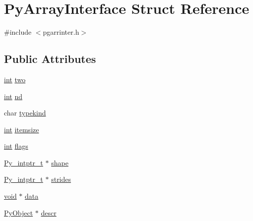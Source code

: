 \hypertarget{struct_py_array_interface}{}\section{Py\+Array\+Interface Struct Reference}
\label{struct_py_array_interface}


{\ttfamily \#include $<$pgarrinter.\+h$>$}

\subsection*{Public Attributes}
\begin{DoxyCompactItemize}
\item 
\mbox{\hyperlink{warnings_8h_a74f207b5aa4ba51c3a2ad59b219a423b}{int}} \mbox{\hyperlink{struct_py_array_interface_ab6d24fbafdbe601ef3c77720ffecb470}{two}}
\item 
\mbox{\hyperlink{warnings_8h_a74f207b5aa4ba51c3a2ad59b219a423b}{int}} \mbox{\hyperlink{struct_py_array_interface_a7d5208cc0c4f5bcaaeff6e1bf02e35e3}{nd}}
\item 
char \mbox{\hyperlink{struct_py_array_interface_aae32b9e36b1b8fead0c2f69f2c5b899f}{typekind}}
\item 
\mbox{\hyperlink{warnings_8h_a74f207b5aa4ba51c3a2ad59b219a423b}{int}} \mbox{\hyperlink{struct_py_array_interface_a175d53ca477bddfa28d6d0651bdb1a67}{itemsize}}
\item 
\mbox{\hyperlink{warnings_8h_a74f207b5aa4ba51c3a2ad59b219a423b}{int}} \mbox{\hyperlink{struct_py_array_interface_ae4f40681a287c2abd1b36e9a660a1ad3}{flags}}
\item 
\mbox{\hyperlink{pyport_8h_abd3f9942a9af5f7423b51d51992df0ac}{Py\+\_\+intptr\+\_\+t}} $\ast$ \mbox{\hyperlink{struct_py_array_interface_a2b483e45d797da7b8da5c8eb2e176913}{shape}}
\item 
\mbox{\hyperlink{pyport_8h_abd3f9942a9af5f7423b51d51992df0ac}{Py\+\_\+intptr\+\_\+t}} $\ast$ \mbox{\hyperlink{struct_py_array_interface_a31bddfdd7a448ee4cf4e94c1978b485c}{strides}}
\item 
\mbox{\hyperlink{_s_d_l__opengles2__gl2ext_8h_ae5d8fa23ad07c48bb609509eae494c95}{void}} $\ast$ \mbox{\hyperlink{struct_py_array_interface_a95a1efdd290ee7c788220b3802ccd717}{data}}
\item 
\mbox{\hyperlink{_python27_2object_8h_aadc84ac7aed2cfa6f20c25f62bf3dac7}{Py\+Object}} $\ast$ \mbox{\hyperlink{struct_py_array_interface_a7d517913182eeea2ee7cdb4803185cd6}{descr}}
\end{DoxyCompactItemize}


